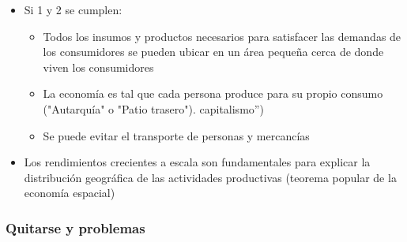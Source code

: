\begin{itemize}
\begin{enumerate}
\begin{itemize}
		\end{itemize}
	\end{enumerate}
    \item Si 1 y 2 se cumplen: 
	\begin{itemize}
	    \item Todos los insumos y productos necesarios para satisfacer las demandas de los consumidores se pueden ubicar en un área pequeña cerca de donde viven los consumidores 
	    \item La economía es tal que cada persona produce para su propio consumo ("Autarquía" o "Patio trasero"). capitalismo”) 
	    \item Se puede evitar el transporte de personas y mercancías 
	\end{itemize}
    \item Los rendimientos crecientes a escala son fundamentales para explicar la distribución geográfica de las actividades productivas (teorema popular de la economía espacial)
\end{itemize}

\subsubsection{Quitarse y problemas}

